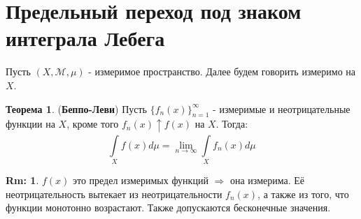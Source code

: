 \documentclass[12pt]{article}
\newcommand{\MM}{\mathcal{M}}
\theoremstyle{definition}
\newtheorem{rem}{Rm:}
\newtheorem{theorem}{Теорема}
\newcommand{\ddint}[2]{\displaystyle\int\limits_{#1}^{#2}}
\begin{document}
\newpage
\section*{Предельный переход под знаком интеграла Лебега}
Пусть $(X,\MM,\mu)$ - измеримое пространство. Далее будем говорить измеримо на $X$.

\begin{theorem}(\textbf{Беппо-Леви})
	Пусть $\{f_n(x)\}_{n = 1}^{\infty}$ - измеримые и неотрицательные функции на $X$, кроме того $f_n(x) \uparrow f(x)$ на $X$. Тогда:
	$$
		\ddint{X}{}f(x)d\mu = \lim\limits_{n \to \infty}\ddint{X}{}f_n(x)d\mu
	$$
\end{theorem}
\begin{rem}
	$f(x)$ это предел измеримых функций $\Rightarrow$ она измерима. Её неотрицательность вытекает из неотрицательности $f_n(x)$, а также из того, что функции монотонно возрастают. Также допускаются бесконечные значения.
\end{rem}
\end{document}
